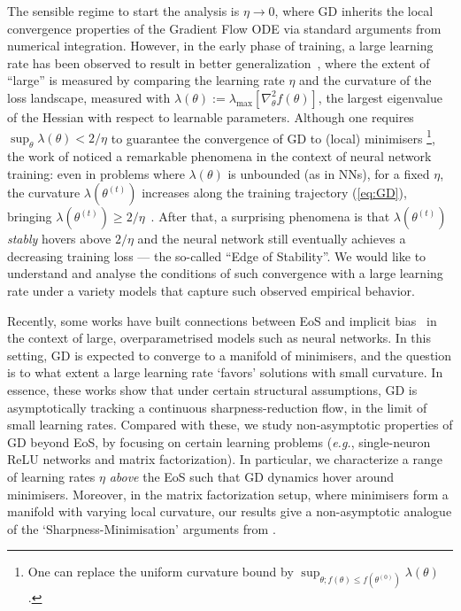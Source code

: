 \documentclass{article}
\newcommand{\citep}[1]{\cite{#1}}
\theoremstyle{plain}
\theoremstyle{remark}
\newcommand{\joan}[1]{}
\newcommand{\lei}[1]{\noindent{\color{red}{[Lei: #1]}}}
\begin{document}
The sensible regime to start the analysis is $\eta\to 0$, where GD inherits the local convergence properties of the Gradient Flow ODE via standard arguments from numerical integration. However, in the early phase of training, a large learning rate has been observed to result in better generalization~\citep{lecun2012efficient,bjorck2018understanding,jiang2019fantastic,jastrzebski2021catastrophic}, 
where the extent of ``large'' is measured by comparing the learning rate $\eta$ and the curvature of the loss landscape, measured with $\lambda(\theta):=\lambda_{\text{max}}\left[\nabla_\theta^2 f(\theta)\right]$, the largest eigenvalue of the Hessian with respect to learnable parameters. Although one requires $\sup_\theta \lambda(\theta)< 2/\eta$ to guarantee the convergence of GD \citep{bottou2018optimization} to (local) minimisers \footnote{One can replace the uniform curvature bound by $\sup_{\theta; f(\theta) \leq f(\theta^{(0)})} \lambda(\theta)$.}, the work of \citep{cohen2020gradient} noticed a remarkable phenomena in the context of neural network training: even in problems where $\lambda(\theta)$ is unbounded (as in NNs), for a fixed $\eta$, the curvature $\lambda(\theta^{(t)})$ increases along the training trajectory (\ref{eq:GD}), bringing $\lambda(\theta^{(t)}) \ge 2/\eta$~\citep{cohen2020gradient}. After that, a surprising phenomena is that $\lambda(\theta^{(t)})$  \textit{stably} hovers above $2/\eta$ and the neural network %
still eventually achieves a decreasing training loss  --- the so-called ``Edge of Stability''. We would like to understand and analyse the conditions of such convergence with a large learning rate under a variety models that capture such observed empirical behavior. 

 Recently, some works have built connections between EoS and implicit bias~\citep{arora2022understanding, lyu2022understanding, damian2021label, damian2022self} in the context of large, overparametrised models such as neural networks. In this setting, GD is expected to converge to a manifold of minimisers, and the question is to what extent a large learning rate `favors' solutions with small curvature. In essence, these works show that under certain structural assumptions, GD is asymptotically tracking a continuous sharpness-reduction flow, in the limit of small learning rates. Compared with these, we study non-asymptotic properties of GD beyond EoS, by focusing on certain learning problems (\textit{e.g.}, single-neuron ReLU networks and matrix factorization). In particular, we characterize a range of learning rates $\eta$ \emph{above} the EoS such that GD dynamics hover around minimisers. Moreover, in the matrix factorization setup, where minimisers form a manifold with varying local curvature, our results give a non-asymptotic analogue of the `Sharpness-Minimisation' arguments from \cite{arora2022understanding, lyu2022understanding, damian2022self}.
 
\end{document}
